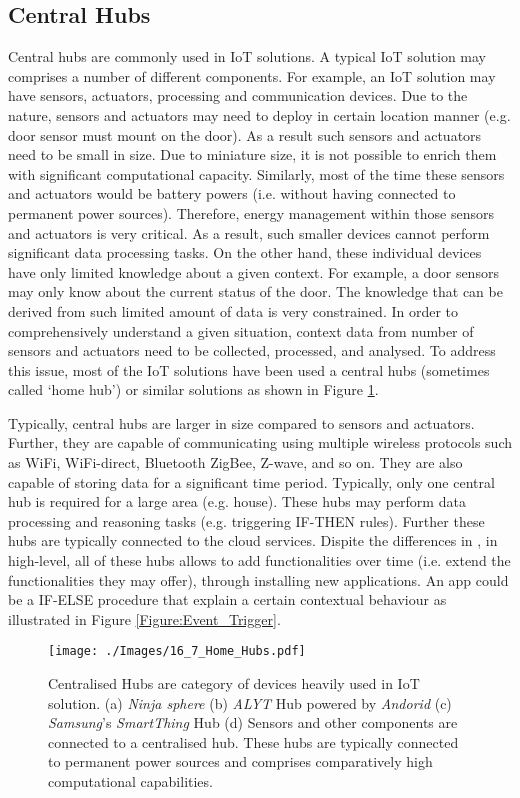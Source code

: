 \documentclass[journal]{IEEEtran}
\begin{document}
       
   \subsection{Central Hubs}
Central hubs are commonly used in IoT solutions. A typical IoT solution may comprises a  number of different components. For example, an IoT solution may have sensors, actuators, processing and communication devices. Due to the nature, sensors and actuators may need to deploy in certain location manner (e.g. door sensor must mount on the door). As a result such sensors and actuators need to be small in size. Due to miniature size, it is not possible to enrich them with significant computational capacity. Similarly, most of the time these sensors and actuators would be battery powers (i.e. without having connected to permanent power sources). Therefore, energy management within those sensors and actuators is very critical. As a result, such smaller devices cannot perform significant data processing tasks. On the other hand, these individual devices have only limited knowledge about a given context. For example, a door sensors may only know about the current status of the door. The knowledge that can be derived from such limited amount of data is very constrained. In order to comprehensively understand a given situation, context data from number of sensors and actuators need to be collected, processed, and analysed. To address this issue, most of the IoT solutions have been used a central hubs (sometimes called `home hub') or similar solutions as shown in Figure \ref{Figure:Home_Hubs}.



Typically, central hubs are larger in size compared to sensors and actuators. Further, they are capable of communicating using multiple wireless protocols such as  WiFi, WiFi-direct, Bluetooth ZigBee, Z-wave, and so on. They are also capable of storing data for a significant time period. Typically, only one central hub is required for a large area (e.g. house). These hubs may perform data processing and reasoning tasks (e.g. triggering IF-THEN rules). Further these hubs are typically connected to the cloud services. Dispite the differences in , in high-level, all of these hubs allows to add functionalities over time (i.e. extend the functionalities they may offer), through installing new applications. An app could be a IF-ELSE procedure that explain a certain contextual behaviour as illustrated in Figure \ref{Figure:Event_Trigger}.


      \begin{figure}[!h]
       \centering
\texttt{[image: ./Images/16\_7\_Home\_Hubs.pdf]}
\caption{Centralised Hubs are category of devices heavily used in IoT solution.  (a) \textit{Ninja sphere} (b) \textit{ALYT} Hub powered by \textit{Andorid} (c) \textit{Samsung}'s \textit{SmartThing} Hub (d) Sensors and other components are connected to a centralised hub. These hubs are typically connected to permanent power sources and comprises comparatively high computational capabilities.}
       \label{Figure:Home_Hubs}	
\end{figure}
\end{document}
